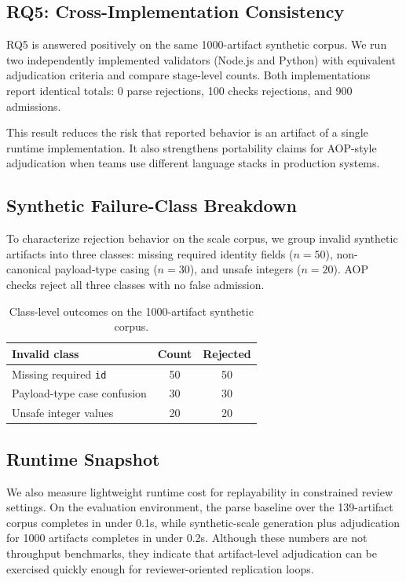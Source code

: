 \documentclass[10pt,conference]{IEEEtran}
\begin{document}
\subsection{RQ5: Cross-Implementation Consistency}

RQ5 is answered positively on the same 1000-artifact synthetic corpus. We run
two independently implemented validators (Node.js and Python) with equivalent
adjudication criteria and compare stage-level counts. Both implementations
report identical totals: 0 parse rejections, 100 checks rejections, and
900 admissions.

This result reduces the risk that reported behavior is an artifact of a single
runtime implementation. It also strengthens portability claims for AOP-style
adjudication when teams use different language stacks in production systems.

\subsection{Synthetic Failure-Class Breakdown}

To characterize rejection behavior on the scale corpus, we group invalid
synthetic artifacts into three classes: missing required identity fields
($n=50$), non-canonical payload-type casing ($n=30$), and unsafe integers
($n=20$). AOP checks reject all three classes with no false admission.

\begin{table}[t]
\centering
\caption{Class-level outcomes on the 1000-artifact synthetic corpus.}
\begin{tabular}{lcc}
\toprule
Invalid class & Count & Rejected \\
\midrule
Missing required \texttt{id} & 50 & 50 \\
Payload-type case confusion & 30 & 30 \\
Unsafe integer values & 20 & 20 \\
\bottomrule
\end{tabular}
\end{table}

\subsection{Runtime Snapshot}

We also measure lightweight runtime cost for replayability in constrained
review settings. On the evaluation environment, the parse baseline over the
139-artifact corpus completes in under 0.1s, while synthetic-scale generation
plus adjudication for 1000 artifacts completes in under 0.2s. Although these
numbers are not throughput benchmarks, they indicate that artifact-level
adjudication can be exercised quickly enough for reviewer-oriented replication
loops.
\end{document}
